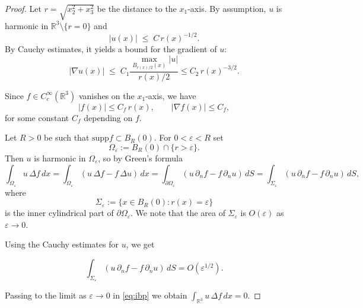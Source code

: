\documentclass{article}
\newcommand{\R}{\mathbb{R}}
\begin{document}
\begin{proof}

Let $r=\sqrt{x_2^2+x_3^2}$ be the distance to the $x_1$-axis. By assumption,
$u$ is harmonic in $\R^3\setminus\{r=0\}$ and
\[
|u(x)| \;\leq\; C\,r(x)^{-1/2}.
\]
By Cauchy estimates, it yields a bound for the gradient of $u$: 
 \[
|\nabla u(x)| \;\leq\; C_1 \frac{\max
\limits_{B_{r(x)/2}(x)}|u|}{r(x)/2} \leq C_2 \,r(x)^{-3/2}.
\]

Since $f\in C_c^\infty(\R^3)$ vanishes on the $x_1$-axis, we have
\begin{equation}\label{eq:f-r}
|f(x)| \le C_f\,r(x),
\qquad
|\nabla f(x)| \le C_f,
\end{equation}
for some constant $C_f$ depending on $f$.

Let $R>0$ be such that $\text{supp} f\subset B_R(0)$. For $0<\varepsilon<R$ set
\[
\Omega_\varepsilon := B_R(0)\cap\{r>\varepsilon\}.
\]
Then $u$ is harmonic in $\Omega_\varepsilon$, so by Green’s formula
\begin{equation}\label{eq:ibp}
\int_{\Omega_\varepsilon} u\,\Delta f\,dx=\int_{\Omega_\varepsilon} (u\,\Delta f - f\,\Delta u)\,dx
= \int_{\partial\Omega_\varepsilon} (u\,\partial_n f - f\,\partial_n u)\,dS 
= \int_{\Sigma_\varepsilon} (u\,\partial_n f - f\,\partial_n u)\,dS,
\end{equation}
where
\[
\Sigma_\varepsilon := \{x\in B_R(0): r(x)=\varepsilon\}
\]
is the inner cylindrical part of  $\partial\Omega_\varepsilon$. We note that the area of 
$\Sigma_\varepsilon$ is $O(\varepsilon)$ as $\varepsilon \to 0$.

Using the Cauchy estimates for $u$, we get 

$$\int_{\Sigma_\varepsilon} (u\,\partial_n f - f\,\partial_n u)\,dS= O(\varepsilon^{1/2}).$$

Passing to the limit as $\varepsilon\to 0$ in \eqref{eq:ibp} we obtain
$
\int_{\R^3} u\,\Delta f\,dx = 0.
$


\end{proof}
\end{document}
